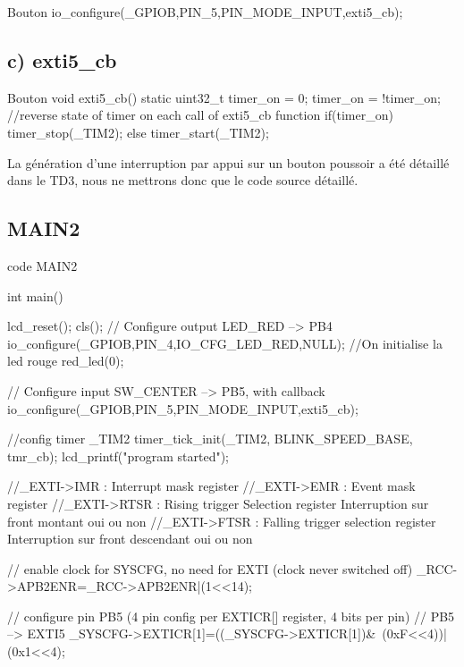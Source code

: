 {\begin{Cpp}{ Bouton} 
io_configure(_GPIOB,PIN_5,PIN_MODE_INPUT,exti5_cb);
\end{Cpp}

\subsection{c) exti5\_cb}

\begin{Cpp}{ Bouton} 
void exti5_cb()
{
    static uint32_t timer_on = 0;
    timer_on = !timer_on;  //reverse state of timer on each call of exti5_cb function
    if(timer_on)
    {
        timer_stop(_TIM2); 
    }
    else
    {
        timer_start(_TIM2);
    }
}
\end{Cpp}

La génération d'une interruption par appui sur un bouton poussoir a été détaillé dans le TD3, nous ne mettrons donc que le code source détaillé.

\newpage
\subsection{MAIN2}

\begin{Cpp}{code MAIN2} 

int main()
{
    lcd_reset(); cls();
    // Configure output LED_RED   --> PB4
    io_configure(_GPIOB,PIN_4,IO_CFG_LED_RED,NULL); //On initialise la led rouge
    red_led(0);

    // Configure input SW_CENTER --> PB5, with callback
    io_configure(_GPIOB,PIN_5,PIN_MODE_INPUT,exti5_cb);

    
    //config timer _TIM2 
    timer_tick_init(_TIM2, BLINK_SPEED_BASE, tmr_cb);
    lcd_printf("program started"); 
    
    //_EXTI->IMR : Interrupt mask register
    //_EXTI->EMR : Event mask register
    //_EXTI->RTSR : Rising trigger Selection register Interruption sur front montant oui ou non
    //_EXTI->FTSR : Falling trigger selection register Interruption sur front descendant oui ou non

    // enable clock for SYSCFG, no need for EXTI (clock never switched off)
    _RCC->APB2ENR=_RCC->APB2ENR|(1<<14);
    
    // configure pin PB5 (4 pin config per EXTICR[] register, 4 bits per pin)
    //   PB5 --> EXTI5
    _SYSCFG->EXTICR[1]=((_SYSCFG->EXTICR[1])&~(0xF<<4))|(0x1<<4);
        
}
\end{Cpp}}
